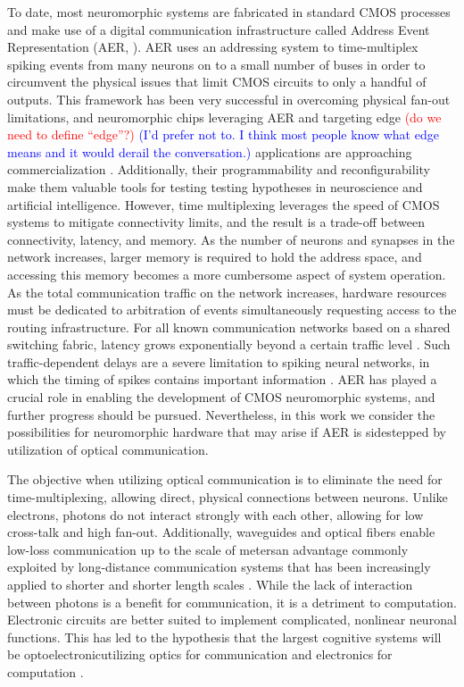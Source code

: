 \documentclass[twocolumn]{article}
\begin{document}
To date, most neuromorphic systems are fabricated in standard CMOS processes and make use of a digital communication infrastructure called Address Event Representation (AER, \cite{bo2000,payu2017}). AER uses an addressing system to time-multiplex spiking events from many neurons on to a small number of buses in order to circumvent the physical issues that limit CMOS circuits to only a handful of outputs. This framework has been very successful in overcoming physical fan-out limitations, and neuromorphic chips leveraging AER and targeting edge \textcolor{red}{(do we need to define ``edge''?)} \textcolor{blue}{(I'd prefer not to. I think most people know what edge means and it would derail the conversation.)} applications are approaching commercialization \cite{merolla2014million, davies2018loihi}. Additionally, their programmability and reconfigurability make them valuable tools for testing testing hypotheses in neuroscience and artificial intelligence. However, time multiplexing leverages the speed of CMOS systems to mitigate connectivity limits, and the result is a trade-off between connectivity, latency, and memory. As the number of neurons and synapses in the network increases, larger memory is required to hold the address space, and accessing this memory becomes a more cumbersome aspect of system operation. As the total communication traffic on the network increases, hardware resources must be dedicated to arbitration of events simultaneously requesting access to the routing infrastructure. For all known communication networks based on a shared switching fabric, latency grows exponentially beyond a certain traffic level \cite{hepa2011}. Such traffic-dependent delays are a severe limitation to spiking neural networks, in which the timing of spikes contains important information \cite{panzeri2001role}. AER has played a crucial role in enabling the development of CMOS neuromorphic systems, and further progress should be pursued. Nevertheless, in this work we consider the possibilities for neuromorphic hardware that may arise if AER is sidestepped by utilization of optical communication.

The objective when utilizing optical communication is to eliminate the need for time-multiplexing, allowing direct, physical connections between neurons. Unlike electrons, photons do not interact strongly with each other, allowing for low cross-talk and high fan-out. Additionally, waveguides and optical fibers enable low-loss communication up to the scale of meters\textemdash an advantage commonly exploited by long-distance communication systems that has been increasingly applied to shorter and shorter length scales \cite{miller2017attojoule}. While the lack of interaction between photons is a benefit for communication, it is a detriment to computation. Electronic circuits are better suited to implement complicated, nonlinear neuronal functions. This has led to the hypothesis that the largest cognitive systems will be optoelectronic\textemdash utilizing optics for communication and electronics for computation \cite{shainline2018largest}. 
\end{document}
